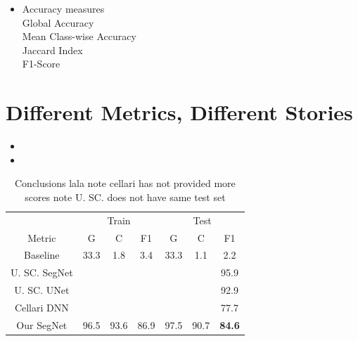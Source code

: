 \documentclass[
]{dtuposter}
\begin{document}
\begin{dtupostercontent}
\begin{itemize}
	\item Accuracy measures \\
		Global Accuracy \\
		Mean Class-wise Accuracy \\
		Jaccard Index \\
		F1-Score
\end{itemize}

\section{Different Metrics, Different Stories}

\begin{itemize}
	\item 
	
	\item 
\end{itemize}

\begin{table}
	\begin{tabular}{c|ccc|ccc|}
		
		\rule[-1ex]{0pt}{2.5ex}  & \multicolumn{3}{c|}{Train} &  \multicolumn{3}{c|}{Test} \\ 
		
		\rule[-1ex]{0pt}{2.5ex} Metric  & G & C & F1 & G & C & F1 \\ 
		\hline
		\rule[-1ex]{0pt}{2.5ex} Baseline&  33.3 &1.8  &3.4  &33.3  &1.1  &2.2  \\ 
		
		\rule[-1ex]{0pt}{2.5ex} U. SC. SegNet    &  &  &  &  &  &95.9  \\ 
		\rule[-1ex]{0pt}{2.5ex} U. SC. UNet   &  &  &  &  &  &92.9  \\ 
		\rule[-1ex]{0pt}{2.5ex} Cellari DNN   &  &  &  &  &  &77.7  \\ 
		\hline 
		\rule[-1ex]{0pt}{2.5ex} Our SegNet & 96.5&93.6  & 86.9 &97.5  & 90.7  &\textbf{84.6}  \\ 
	\end{tabular} 
\caption{Conclusions lala note cellari has not provided more scores note U. SC. does not have same test set}
\end{table}





\end{dtupostercontent}
\end{document}
